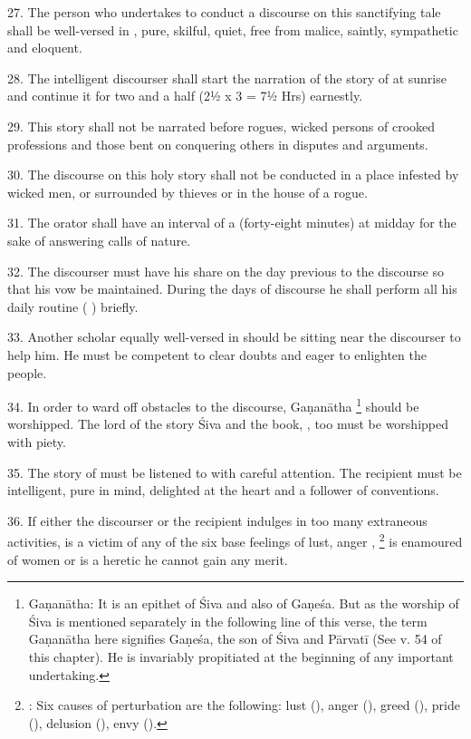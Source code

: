 27. The person who undertakes to conduct a discourse on this sanctifying tale
shall be well-versed in , pure, skilful, quiet, free from malice,
saintly, sympathetic and eloquent.

28. The intelligent discourser shall start the narration of the story of
 at sunrise and continue it for two and a half 
(2½ x 3 = 7½ Hrs) earnestly.

29. This story shall not be narrated before rogues, wicked persons of crooked
professions and those bent on conquering others in disputes and arguments.

30. The discourse on this holy story shall not be conducted in a place infested
by wicked men, or surrounded by thieves or in the house of a rogue.

31. The orator shall have an interval of a  (forty-eight minutes)
at midday for the sake of answering calls of nature.

32. The discourser must have his share on the day previous to the discourse so
that his vow be maintained. During the days of discourse he shall perform all
his daily routine ( \etc) briefly.

33. Another scholar equally well-versed in  should be sitting near
the discourser to help him. He must be competent to clear doubts and eager to
enlighten the people.

34. In order to ward off obstacles to the discourse, Gaṇanātha
\footnote{Gaṇanātha: It is an epithet of Śiva and also of Gaṇeśa. But as the
worship of Śiva is mentioned separately in the following line of this verse,
the term Gaṇanātha here signifies Gaṇeśa, the son of Śiva and Pārvatī (See v. 54
of this chapter). He is invariably propitiated at the beginning of any important
undertaking.} should be worshipped. The lord of the story Śiva and the book,
, too must be worshipped with piety.

35. The story of  must be listened to with careful attention.
The recipient must be intelligent, pure in mind, delighted at the heart and a
follower of conventions.

36. If either the discourser or the recipient indulges in too many extraneous
activities, is a victim of any of the six base feelings of lust, anger \etc,
\footnote{: Six causes of perturbation are the following: lust
(), anger (), greed (), pride (),
delusion (), envy ().} is enamoured of women or is a
heretic he cannot gain any merit.


